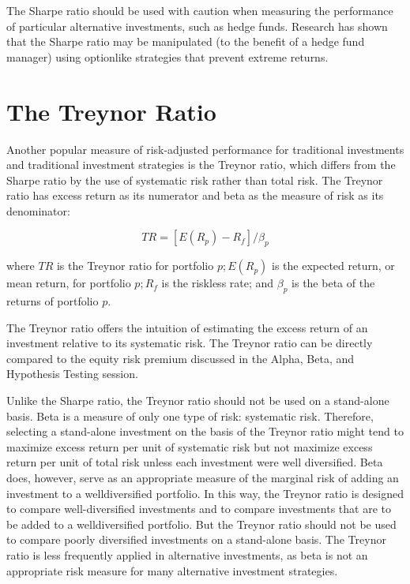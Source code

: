 \documentclass[11pt]{article}
\begin{document}
The Sharpe ratio should be used with caution when measuring the performance of particular alternative investments, such as hedge funds. Research has shown that the Sharpe ratio may be manipulated (to the benefit of a hedge fund manager) using optionlike strategies that prevent extreme returns.

\section*{The Treynor Ratio}
Another popular measure of risk-adjusted performance for traditional investments and traditional investment strategies is the Treynor ratio, which differs from the Sharpe ratio by the use of systematic risk rather than total risk. The Treynor ratio has excess return as its numerator and beta as the measure of risk as its denominator:


\begin{equation*}
T R=\left[E\left(R_{p}\right)-R_{f}\right] / \beta_{p} \tag{3}
\end{equation*}


where $T R$ is the Treynor ratio for portfolio $p ; E\left(R_{p}\right)$ is the expected return, or mean return, for portfolio $p ; R_{f}$ is the riskless rate; and $\beta_{p}$ is the beta of the returns of portfolio $p$.

The Treynor ratio offers the intuition of estimating the excess return of an investment relative to its systematic risk. The Treynor ratio can be directly compared to the equity risk premium discussed in the Alpha, Beta, and Hypothesis Testing session.

Unlike the Sharpe ratio, the Treynor ratio should not be used on a stand-alone basis. Beta is a measure of only one type of risk: systematic risk. Therefore, selecting a stand-alone investment on the basis of the Treynor ratio might tend to maximize excess return per unit of systematic risk but not maximize excess return per unit of total risk unless each investment were well diversified. Beta does, however, serve as an appropriate measure of the marginal risk of adding an investment to a welldiversified portfolio. In this way, the Treynor ratio is designed to compare well-diversified investments and to compare investments that are to be added to a welldiversified portfolio. But the Treynor ratio should not be used to compare poorly diversified investments on a stand-alone basis. The Treynor ratio is less frequently applied in alternative investments, as beta is not an appropriate risk measure for many alternative investment strategies.
\end{document}
